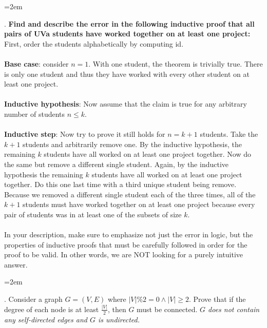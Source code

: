 \documentclass[12pt]{article}
\newcounter{quesnum}
\newcommand{\question}[2][??]{
\begin{list}{\labelitemi}{\leftmargin=2em}
\item [\arabic{quesnum}.] {} {#2}
\end{list}
\addtocounter{quesnum}{1}
}
\begin{document}
\question[3]{
\textbf{Find and describe the error in the following inductive proof that all pairs of UVa students have worked together on at least one project:} First, order the students alphabetically by computing id.\\
\\
\textbf{Base case}: consider $n=1$. With one student, the theorem is trivially true. There is only one student and thus they have worked with every other student on at least one project.\\
\\
\textbf{Inductive hypothesis}: Now assume that the claim is true for any arbitrary number of students $n \leq k$.\\
\\
\textbf{Inductive step}: Now try to prove it still holds for $n=k+1$ students. Take the $k+1$ students and arbitrarily remove one. By the inductive hypothesis, the remaining $k$ students have all worked on at least one project together. Now do the same but remove a different single student. Again, by the inductive hypothesis the remaining $k$ students have all worked on at least one project together. Do this one last time with a third unique student being remove. Because we removed a different single student each of the three times, all of the $k+1$ students must have worked together on at least one project because every pair of students was in at least one of the subsets of size $k$.\\
\\
In your description, make sure to emphasize not just the error in logic, but the properties of inductive proofs that must be carefully followed in order for the proof to be valid. In other words, we are NOT looking for a purely intuitive answer.}

\vspace{12pt}


\question[3]{
Consider a graph $G=(V,E)$ where $|V| \% 2 = 0 \wedge |V| \geq 2$. Prove that if the degree of each node is at least $\frac{|V|}{2}$, then $G$ must be connected. \emph{$G$ does not contain any self-directed edges and $G$ is undirected.}
}

\vspace{12pt}
\end{document}
